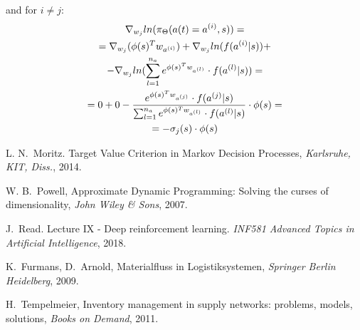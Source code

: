 \documentclass[journal, a4paper]{IEEEtran}
\theoremstyle{plain}
\theoremstyle{definition}
\begin{document}
and for $i \neq j$:
\begin{gather}
\nabla_{w_j} ln(\pi_\Theta(a(t) = a^{(i)},s))= 
\notag
\\ 
=\nabla_{w_j} (\phi(s)^T w_{a^{(i)}}) + \nabla_{w_j} ln(f(a^{(i)}|s))
+
\notag
\\
 - 
\nabla_{w_j} ln(\sum_{l=1}^{n_a} e^{\phi(s)^T w_{a^{(l)}}}\cdot f(a^{(l)}|s))=
\notag
\\
=
0 + 0 - \frac{ e^{\phi(s)^T w_{a^{(j)}}} \cdot f(a^{(j)}|s)}{\sum_{l=1}^{n_a} e^{\phi(s)^T w_{a^{(l)}}}\cdot f(a^{(l)}|s)} \cdot \phi(s)
=
\notag
\\
=-\sigma_j(s)\cdot \phi(s)
\end{gather}

\begin{thebibliography}{4}

	L. N.~Moritz. Target Value Criterion in Markov Decision Processes,
	\textit{Karlsruhe, KIT, Diss.}, 2014.

	W. B.~Powell,  Approximate Dynamic Programming: Solving the curses of dimensionality,
	{\em John Wiley \& Sons}, 2007.

	J.~Read. Lecture IX - Deep reinforcement learning. \textit{INF581 Advanced Topics in Artificial Intelligence}, 2018.

	K.~Furmans, D.~Arnold, Materialfluss in Logistiksystemen,
	{\em Springer Berlin Heidelberg}, 2009.

	H.~Tempelmeier, Inventory management in supply networks: problems, models, solutions,
	{\em Books on Demand}, 2011.





\end{thebibliography}

\end{document}
